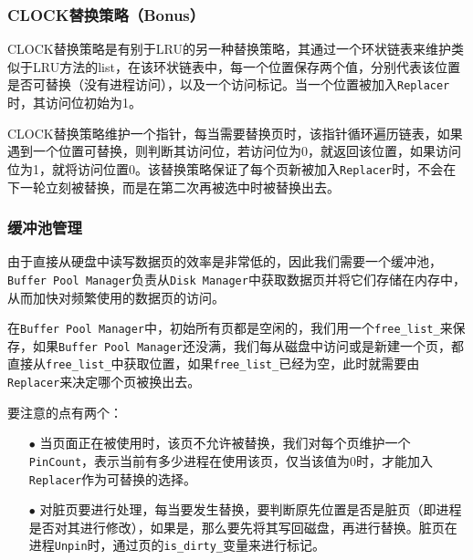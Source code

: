 \documentclass[12pt]{article}
\begin{document}
    \subsubsection{CLOCK替换策略（Bonus）}
    CLOCK替换策略是有别于LRU的另一种替换策略，其通过一个环状链表来维护类似于LRU方法的list，在该环状链表中，每一个位置保存两个值，分别代表该位置是否可替换（没有进程访问），以及一个访问标记。当一个位置被加入\texttt{Replacer}时，其访问位初始为1。

    CLOCK替换策略维护一个指针，每当需要替换页时，该指针循环遍历链表，如果遇到一个位置可替换，则判断其访问位，若访问位为0，就返回该位置，如果访问位为1，就将访问位置0。该替换策略保证了每个页新被加入\texttt{Replacer}时，不会在下一轮立刻被替换，而是在第二次再被选中时被替换出去。

    \subsubsection{缓冲池管理}
    由于直接从硬盘中读写数据页的效率是非常低的，因此我们需要一个缓冲池，\texttt{Buffer Pool Manager}负责从\texttt{Disk Manager}中获取数据页并将它们存储在内存中，从而加快对频繁使用的数据页的访问。

    在\texttt{Buffer Pool Manager}中，初始所有页都是空闲的，我们用一个\texttt{free\_list\_}来保存，如果\texttt{Buffer Pool Manager}还没满，我们每从磁盘中访问或是新建一个页，都直接从\texttt{free\_list\_}中获取位置，如果\texttt{free\_list\_}已经为空，此时就需要由\texttt{Replacer}来决定哪个页被换出去。
    \vspace{0.5cm}
    
    要注意的点有两个：
    \begin{itemize}
        \item[$\bullet$] 当页面正在被使用时，该页不允许被替换，我们对每个页维护一个\texttt{PinCount}，表示当前有多少进程在使用该页，仅当该值为0时，才能加入\texttt{Replacer}作为可替换的选择。
        \item[$\bullet$] 对脏页要进行处理，每当要发生替换，要判断原先位置是否是脏页（即进程是否对其进行修改），如果是，那么要先将其写回磁盘，再进行替换。脏页在进程\texttt{Unpin}时，通过页的\texttt{is\_dirty\_}变量来进行标记。
    \end{itemize}
\end{document}
